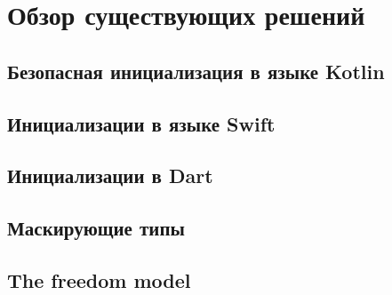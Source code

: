 \chapter{Обзор существующих решений}\label{ch:обзор-существующих-решений}


\section{Безопасная инициализация в языке Kotlin}\label{sec:безопасная-инициализация-в-языке-kotlin}



\section{Инициализации в языке Swift}\label{sec:инициализации-в-языке-swift}



\section{Инициализации в Dart}\label{sec:инициализации-в-dart}



\section{Маскирующие типы}\label{sec:bar}



\section{The freedom model}\label{sec:the-freedom-model}


